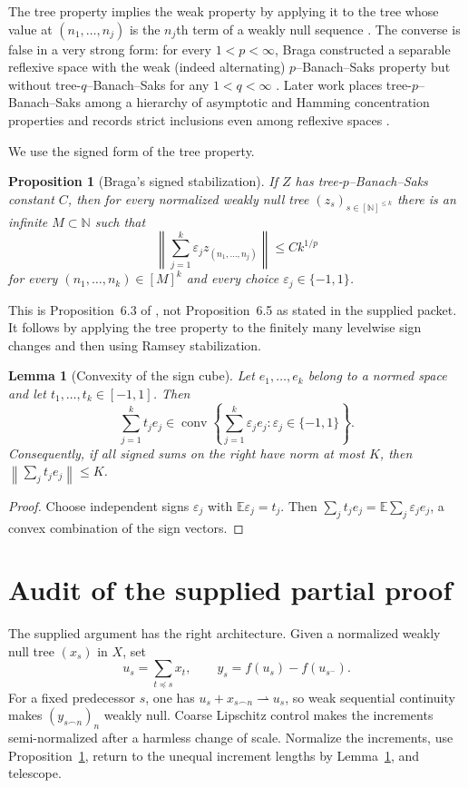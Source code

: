 \documentclass[11pt]{amsart}
\newtheorem{proposition}[theorem]{Proposition}
\newtheorem{lemma}[theorem]{Lemma}
\theoremstyle{definition}
\theoremstyle{remark}
\newcommand{\N}{\mathbb N}
\newcommand{\eps}{\varepsilon}
\newcommand{\conv}{\operatorname{conv}}
\newcommand{\norm}[1]{\left\lVert #1\right\rVert}
\newcommand{\set}[1]{\left\{#1\right\}}
\begin{document}
The tree property implies the weak property by applying it to the tree whose value at $(n_1,\ldots,n_j)$ is the $n_j$th term of a weakly null sequence \cite[Remark~6.4]{BragaJIMJ}.  The converse is false in a very strong form: for every $1<p<\infty$, Braga constructed a separable reflexive space with the weak (indeed alternating) $p$--Banach--Saks property but without tree-$q$--Banach--Saks for any $1<q<\infty$ \cite[Theorem~7.1]{BragaJIMJ}.  Later work places tree-$p$--Banach--Saks among a hierarchy of asymptotic and Hamming concentration properties and records strict inclusions even among reflexive spaces \cite{FovelleHamming,CauseyFovelleLancien}.

We use the signed form of the tree property.

\begin{proposition}[Braga's signed stabilization]\label{prop:signed-tree}
If $Z$ has tree-$p$--Banach--Saks constant $C$, then for every normalized weakly null tree $(z_s)_{s\in[\N]^{\le k}}$ there is an infinite $M\subset\N$ such that
\[
 \norm{\sum_{j=1}^k \eps_j z_{(n_1,\ldots,n_j)}}\le Ck^{1/p}
\]
for every $(n_1,\ldots,n_k)\in[M]^k$ and every choice $\eps_j\in\{-1,1\}$.
\end{proposition}

This is Proposition~6.3 of \cite{BragaJIMJ}, not Proposition~6.5 as stated in the supplied packet.  It follows by applying the tree property to the finitely many levelwise sign changes and then using Ramsey stabilization.

\begin{lemma}[Convexity of the sign cube]\label{lem:sign-cube}
Let $e_1,\ldots,e_k$ belong to a normed space and let $t_1,\ldots,t_k\in[-1,1]$.  Then
\[
 \sum_{j=1}^k t_j e_j\in
 \conv\set{\sum_{j=1}^k\eps_j e_j:\eps_j\in\{-1,1\}}.
\]
Consequently, if all signed sums on the right have norm at most $K$, then $\norm{\sum_jt_je_j}\le K$.
\end{lemma}

\begin{proof}
Choose independent signs $\eps_j$ with $\mathbb E\eps_j=t_j$.  Then
$\sum_jt_je_j=\mathbb E\sum_j\eps_je_j$, a convex combination of the sign vectors.
\end{proof}

\section{Audit of the supplied partial proof}

The supplied argument has the right architecture.  Given a normalized weakly null tree $(x_s)$ in $X$, set
\[
 u_s=\sum_{t\preceq s}x_t,
 \qquad
 y_s=f(u_s)-f(u_{s^-}).
\]
For a fixed predecessor $s$, one has $u_s+x_{s\frown n}\rightharpoonup u_s$, so weak sequential continuity makes $(y_{s\frown n})_n$ weakly null.  Coarse Lipschitz control makes the increments semi-normalized after a harmless change of scale.  Normalize the increments, use Proposition~\ref{prop:signed-tree}, return to the unequal increment lengths by Lemma~\ref{lem:sign-cube}, and telescope.
\end{document}
